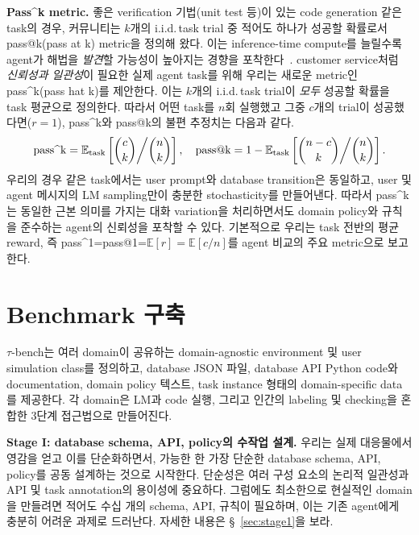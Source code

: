 \documentclass{article}
\newcommand{\benchmark}{$\tau$-bench}
\begin{document}
\textbf{Pass\textasciicircum k metric.} 좋은 verification 기법(unit test 등)이 있는 code generation 같은 task의 경우, 커뮤니티는 $k$개의 i.i.d.\,task trial 중 적어도 하나가 성공할 확률로서 pass@k(pass at k) metric을 정의해 왔다. 이는 inference-time compute를 늘릴수록 agent가 해법을 \emph{발견}할 가능성이 높아지는 경향을 포착한다~\citep{chen2021evaluating}. customer service처럼 \textit{신뢰성과 일관성}이 필요한 실제 agent task를 위해 우리는 새로운 metric인 pass\textasciicircum k(pass hat k)를 제안한다. 이는 $k$개의 i.i.d.\,task trial이 \textit{모두} 성공할 확률을 task 평균으로 정의한다. 따라서 어떤 task를 $n$회 실행했고 그중 $c$개의 trial이 성공했다면($r=1$), pass\textasciicircum k와 pass@k의 불편 추정치는 다음과 같다.
\begin{equation*}
    \text{pass\textasciicircum k} = \mathbb{E}_{\text{task}}\left[ \binom{c}{k} \middle/ \binom{n}{k} \right], \quad \text{pass@k} = 1 - \mathbb{E}_{\text{task}}\left[ \binom{n-c}{k} \middle/  \binom{n}{k}\right].
\end{equation*}
우리의 경우 같은 task에서는 user prompt와 database transition은 동일하고, user 및 agent 메시지의 LM sampling만이 충분한 stochasticity를 만들어낸다. 따라서 pass\textasciicircum k는 동일한 근본 의미를 가지는 대화 variation을 처리하면서도 domain policy와 규칙을 준수하는 agent의 신뢰성을 포착할 수 있다. 기본적으로 우리는 task 전반의 평균 reward, 즉 pass\textasciicircum 1=pass@1=$\mathbb{E}[r]=\mathbb{E}[c / n]$를 agent 비교의 주요 metric으로 보고한다.


\section{Benchmark 구축}

\benchmark{}는 여러 domain이 공유하는 domain-agnostic environment 및 user simulation class를 정의하고, database JSON 파일, database API Python code와 documentation, domain policy 텍스트, task instance 형태의 domain-specific data를 제공한다. 각 domain은 LM과 code 실행, 그리고 인간의 labeling 및 checking을 혼합한 3단계 접근법으로 만들어진다.

\textbf{Stage I: database schema, API, policy의 수작업 설계.} 우리는 실제 대응물에서 영감을 얻고 이를 단순화하면서, 가능한 한 가장 단순한 database schema, API, policy를 공동 설계하는 것으로 시작한다. 단순성은 여러 구성 요소의 논리적 일관성과 API 및 task annotation의 용이성에 중요하다. 그럼에도 최소한으로 현실적인 domain을 만들려면 적어도 수십 개의 schema, API, 규칙이 필요하며, 이는 기존 agent에게 충분히 어려운 과제로 드러난다. 자세한 내용은 \S~\ref{sec:stage1}을 보라.
\end{document}
